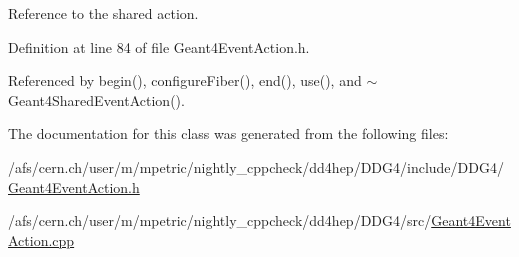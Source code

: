 Reference to the shared action. 

Definition at line 84 of file Geant4EventAction.h.

Referenced by begin(), configureFiber(), end(), use(), and $\sim$Geant4SharedEventAction().

The documentation for this class was generated from the following files:\begin{DoxyCompactItemize}
\item 
/afs/cern.ch/user/m/mpetric/nightly\_\-cppcheck/dd4hep/DDG4/include/DDG4/\hyperlink{_geant4_event_action_8h}{Geant4EventAction.h}\item 
/afs/cern.ch/user/m/mpetric/nightly\_\-cppcheck/dd4hep/DDG4/src/\hyperlink{_geant4_event_action_8cpp}{Geant4EventAction.cpp}\end{DoxyCompactItemize}
